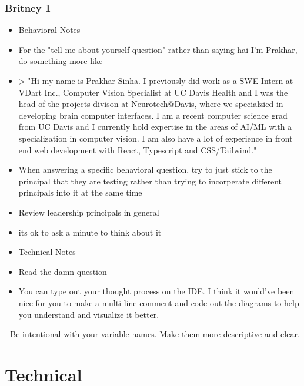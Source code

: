 \documentclass{article}
\begin{document}
\subsubsection{Britney 1}
\begin{itemize}
\item Behavioral Notes
\item For the "tell me about yourself question" rather than saying hai I'm Prakhar, do something more like
\item > "Hi my name is Prakhar Sinha. I previously did work as a SWE Intern at VDart Inc., Computer Vision Specialist at UC Davis Health and I was the head of the projects divison at Neurotech@Davis, where we specialzied in developing brain computer interfaces. I am a recent computer science grad from UC Davis and I currently hold expertise in the areas of AI/ML with a specialization in computer vision. I am also have a lot of experience in front end web development with React, Typescript and CSS/Tailwind."
\item When answering a specific behavioral question, try to just stick to the principal that they are testing rather than trying to incorperate different principals into it at the same time
\item Review leadership principals in general
\item its ok to ask a minute to think about it
\item Technical Notes
\item Read the damn question
\item You can type out your thought process on the IDE. I think it would’ve been nice for you to make a multi line comment and code out the diagrams to help you understand and visualize it better.
\end{itemize}
  - Be intentional with your variable names. Make them more descriptive and clear.

\section{Technical}
\end{document}
